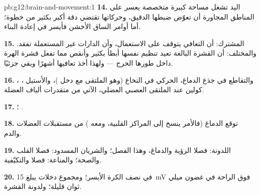 \begin{solution}{pb:g12:brain-and-movement:1}
\textbf{14.} اليد تشغل مساحة كبيرة متخصصة يعسر على المناطق المجاورة أن
تعوّض ضبطها الدقيق، وحركاتها تقتضي دقة أكبر بكثير من خطوة؛ أما أوامر
الساق الأخشن فأيسر في إعادة البناء.

\textbf{15.} المشترك: أن التعافي يتوقف على الاستعمال، وأن الدارات غير
المستعملة تفقد. والمختلف: أن القشرة البالغة تعيد تنظيم نفسها أبطأ بكثير
وأنقص مما تفعل قشرة الهرة داخل طورها الحرج --- ولهذا أخذ تعافيها أشهرًا
وبقي جزئيًا.

\textbf{16.} ، ، والتقاطع في جذع
الدماغ،  الحركي في النخاع (وهو الملتقى مع دخل )،
والأستيل كولين عند الملتقى العصبي العضلي،  الآتي من متقدرات ألياف
العضلة.

\textbf{17.} ؛ .

\textbf{18.} توقع الدماغ (فالأمر ينسخ إلى المراكز القلبية، ومعه
)  من مستقبلات العضلات والدم.

\textbf{19.} اللدونة: فصلا الرؤية والدماغ، وهذا الفصل؛ والشريان
المسدود: فصلا القلب  والصحة؛ والمناعة: فصلا  والتكيّفية.

\textbf{20.}  في نصف الكرة الأيسر؛ ومجموع دخلات
يبلغ \qty{15}{mV} فوق الراحة في غضون ميلي ثوان قليلة؛ ولدونة القشرة.
\end{solution}
